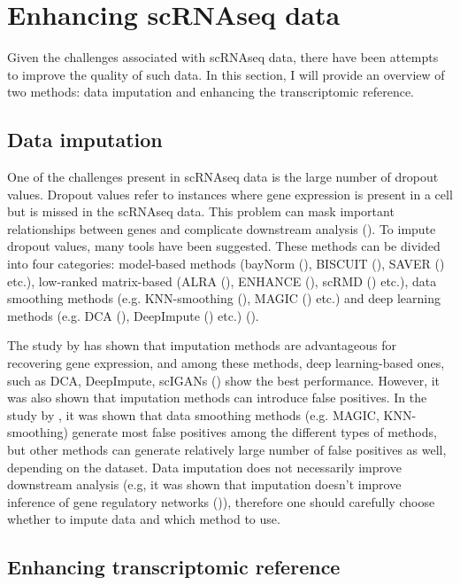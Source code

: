 \section{Enhancing scRNAseq data}

Given the challenges associated with scRNAseq data, there have been attempts to improve the quality of such data.
In this section, I will provide an overview of two methods: data imputation and enhancing the transcriptomic reference.

\subsection{Data imputation}
\label{sec:imputation}

One of the challenges present in scRNAseq data is the large number of dropout values.
Dropout values refer to instances where gene expression is present in a cell but is missed in the scRNAseq data.
This problem can mask important relationships between genes and complicate downstream analysis (\cite{Wang2022}).
To impute dropout values, many tools have been suggested.
These methods can be divided into four categories:
model-based methods (bayNorm (\cite{Tang2019}), BISCUIT (\cite{Azizi2017}), SAVER (\cite{Huang2018}) etc.),
low-ranked matrix-based (ALRA (\cite{Linderman2022}), ENHANCE (\cite{Wagner2019}), scRMD (\cite{Chen2020}) etc.),
data smoothing methods (e.g. KNN-smoothing (\cite{Wagner2017}), MAGIC (\cite{Dijk2018}) etc.) and
deep learning methods (e.g. DCA (\cite{Eraslan2019}), DeepImpute (\cite{Arisdakessian2019}) etc.) (\cite{Wang2022}).

The study by \textcite{Dai2022} has shown that imputation methods are advantageous for recovering gene expression,
and among these methods, deep learning-based ones,
such as DCA, DeepImpute, scIGANs (\cite{Xu2020}) show the best performance.
However, it was also shown that imputation methods can introduce false positives.
In the study by \textcite{Andrews2019}, it was shown that data smoothing methods (e.g. MAGIC, KNN-smoothing)
generate most false positives among the different types of methods,
but other methods can generate relatively large number of false positives as well, depending on the dataset.
Data imputation does not necessarily improve downstream analysis
(e.g, it was shown that imputation doesn't improve inference of gene regulatory networks (\cite{McCalla2023})),
therefore one should carefully choose whether to impute data and which method to use.

\subsection{Enhancing transcriptomic reference}


